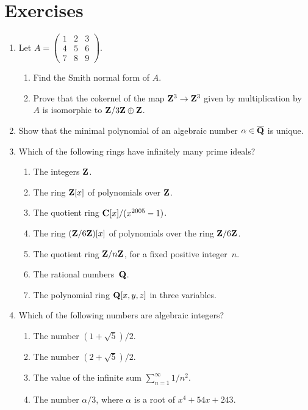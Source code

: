 \chapter{Exercises}
\label{ch:ex1}
\begin{enumerate}
\item 
Let $A=\left(
        \begin{matrix}1&2&3\\4&5&6\\7&8&9
        \end{matrix}\right)$. 
\begin{enumerate}
\item Find the Smith normal form of $A$.
\item Prove that 
the cokernel of the map $\mathbf{Z}^3\to \mathbf{Z}^3$ given by multiplication by~$A$ 
is isomorphic to $\mathbf{Z}/3\mathbf{Z} \oplus \mathbf{Z}$.
\end{enumerate}


\item Show that the minimal polynomial of an algebraic number
  $\alpha\in\overline{\mathbf{Q}}$ is unique. 

\item Which of the following rings have infinitely
many prime ideals?  
\begin{enumerate}
\item The integers $\mathbf{Z}$. 
\item The ring $\mathbf{Z}[x]$ of polynomials over $\mathbf{Z}$.
\item The quotient ring $\mathbf{C}[x]/(x^{2005}-1)$.
\item The ring $(\mathbf{Z}/6\mathbf{Z})[x]$ of polynomials over the ring $\mathbf{Z}/6\mathbf{Z}$.
\item The quotient ring $\mathbf{Z}/n\mathbf{Z}$, for a fixed positive integer~$n$.
\item The rational numbers~$\mathbf{Q}$.
\item The polynomial ring $\mathbf{Q}[x,y,z]$ in three variables.
\end{enumerate}

\item Which of the following numbers are algebraic integers?
\begin{enumerate}
\item The number $(1+\sqrt{5})/2$.
\item The number $(2+\sqrt{5})/2$.
\item The value of the infinite sum $\sum_{n=1}^{\infty} 1/n^2$.
\item The number $\alpha/3$, where $\alpha$ is a root of
$x^4 + 54x + 243$.
\end{enumerate}


\end{enumerate}
